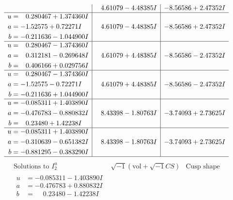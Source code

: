 \documentclass[1p]{elsarticle_modified}
\theoremstyle{definition}
\newcommand{\I}{\sqrt{-1}}
\begin{document}
$$\begin{array}{c|c|c}
 & \phantom{-}4.61079 - 4.48385 I & -8.56586 + 2.47352 I \\ \hline\begin{aligned}
u &= \phantom{-}0.280467 + 1.374360 I \\
a &= -1.52575 + 0.72271 I \\
b &= -0.211636 - 1.044900 I\end{aligned}
 & \phantom{-}4.61079 - 4.48385 I & -8.56586 + 2.47352 I \\ \hline\begin{aligned}
u &= \phantom{-}0.280467 - 1.374360 I \\
a &= \phantom{-}0.312181 - 0.269648 I \\
b &= \phantom{-}0.406166 + 0.029756 I\end{aligned}
 & \phantom{-}4.61079 + 4.48385 I & -8.56586 - 2.47352 I \\ \hline\begin{aligned}
u &= \phantom{-}0.280467 - 1.374360 I \\
a &= -1.52575 - 0.72271 I \\
b &= -0.211636 + 1.044900 I\end{aligned}
 & \phantom{-}4.61079 + 4.48385 I & -8.56586 - 2.47352 I \\ \hline\begin{aligned}
u &= -0.085311 + 1.403890 I \\
a &= -0.476783 - 0.880832 I \\
b &= \phantom{-}0.23480 + 1.42238 I\end{aligned}
 & \phantom{-}8.43398 - 1.80763 I & -3.74093 + 2.73625 I \\ \hline\begin{aligned}
u &= -0.085311 + 1.403890 I \\
a &= -0.310639 - 0.651382 I \\
b &= -0.881295 - 0.383290 I\end{aligned}
 & \phantom{-}8.43398 - 1.80763 I & -3.74093 + 2.73625 I\\
 \hline 
 \end{array}$$\newpage$$\begin{array}{c|c|c}  
\text{Solutions to }I^u_{2}& \I (\text{vol} + \sqrt{-1}CS) & \text{Cusp shape}\\
 \hline 
\begin{aligned}
u &= -0.085311 - 1.403890 I \\
a &= -0.476783 + 0.880832 I \\
b &= \phantom{-}0.23480 - 1.42238 I\end{aligned}

\end{array}$$
\end{document}
